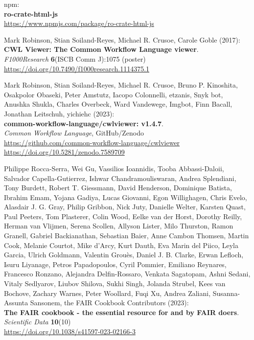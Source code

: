 \begin{thebibliography}{9}
npm:\\
\textbf{ro-crate-html-js}\\
\url{https://www.npmjs.com/package/ro-crate-html-js}

Mark Robinson, Stian Soiland-Reyes, Michael R. Crusoe, Carole Goble (2017):\\
\textbf{CWL Viewer: The Common Workflow Language viewer}.\\
\emph{F1000Research} \textbf{6}(ISCB Comm J):1075 (poster)\\
\url{https://doi.org/10.7490/f1000research.1114375.1} 

Mark Robinson, Stian Soiland-Reyes, Michael R. Crusoe, Bruno P. Kinoshita, Osakpolor Obaseki, Peter Amstutz, Iacopo Colonnelli, etzanis, Snyk bot, Anushka Shukla, Charles Overbeck, Ward Vandewege, Imgbot, Finn Bacall, Jonathan Leitschuh, yichiehc (2023):\\
\textbf{common-workflow-language/cwlviewer: v1.4.7}.\\
\emph{Common Workflow Language}, GitHub/Zenodo\\
\url{https://github.com/common-workflow-language/cwlviewer}\\
\url{https://doi.org/10.5281/zenodo.7589709}

Philippe Rocca-Serra, Wei Gu, Vassilios Ioannidis, Tooba Abbassi-Daloii,
Salvador Capella-Gutierrez, Ishwar Chandramouliswaran, Andrea
Splendiani, Tony Burdett, Robert T. Giessmann, David Henderson,
Dominique Batista, Ibrahim Emam, Yojana Gadiya, Lucas Giovanni, Egon
Willighagen, Chris Evelo, Alasdair J. G. Gray, Philip Gribbon, Nick
Juty, Danielle Welter, Karsten Quast, Paul Peeters, Tom Plasterer, Colin
Wood, Eelke van der Horst, Dorothy Reilly, Herman van Vlijmen, Serena
Scollen, Allyson Lister, Milo Thurston, Ramon Granell, Gabriel
Backianathan, Sebastian Baier, Anne Cambon Thomsen, Martin Cook, Melanie
Courtot, Mike d'Arcy, Kurt Dauth, Eva Marin del Piico, Leyla Garcia,
Ulrich Goldmann, Valentin Grouès, Daniel J. B. Clarke, Erwan Lefloch,
Isuru Liyanage, Petros Papadopoulos, Cyril Pommier, Emiliano Reynares,
Francesco Ronzano, Alejandra Delfin-Rossaro, Venkata Sagatopam, Ashni
Sedani, Vitaly Sedlyarov, Liubov Shilova, Sukhi Singh, Jolanda Strubel,
Kees van Bochove, Zachary Warnes, Peter Woollard, Fuqi Xu, Andrea
Zaliani, Susanna-Assunta Sansonem, the FAIR Cookbook Contributors (2023): \\
\textbf{The {FAIR} cookbook - the essential resource for and by {FAIR} doers}.\\
\emph{Scientific Data} \textbf{10}(10)\\
\url{https://doi.org/10.1038/s41597-023-02166-3}


\end{thebibliography}
